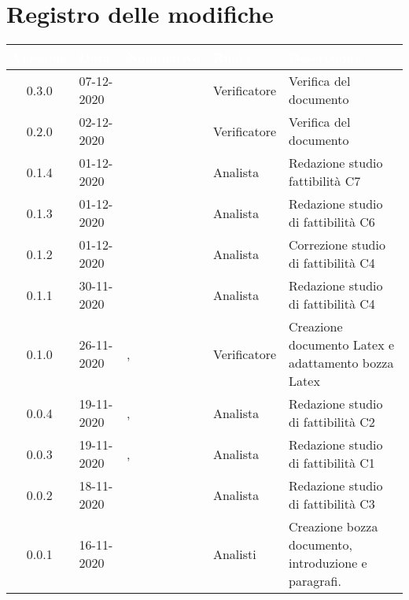 \section*{Registro delle modifiche}
{
\renewcommand{\arraystretch}{1.5}
\centering
\begin{longtable}{c C{2.6cm} C{3cm} C{2.6cm} C{5cm}}
\textcolor{white}{\textbf{Versione}}&
\textcolor{white}{\textbf{Data}}&
\textcolor{white}{\textbf{Nominativo}}&
\textcolor{white}{\textbf{Ruolo}}&
\textcolor{white}{\textbf{Descrizione}}\\	
\endhead

0.3.0 & 07-12-2020 & \SG{} & Verificatore & Verifica del documento\\  
0.2.0 & 02-12-2020 & \BM{} & Verificatore & Verifica del documento\\
0.1.4 & 01-12-2020 & \PA{} & Analista & Redazione studio fattibilità C7\\
0.1.3 & 01-12-2020 & \RA{} & Analista & Redazione studio di fattibilità C6\\
0.1.2 & 01-12-2020 & \ZM{} & Analista & Correzione studio di fattibilità C4\\
0.1.1 & 30-11-2020 & \ZM{} & Analista & Redazione studio di fattibilità C4\\
0.1.0 & 26-11-2020 & \SG{}, \BM{} & Verificatore & Creazione documento Latex e adattamento bozza Latex \\
0.0.4 & 19-11-2020 & \ZM{}, \SP{} & Analista & Redazione studio di fattibilità C2\\
0.0.3 & 19-11-2020 & \ZM{}, \SP{} & Analista & Redazione studio di fattibilità C1\\		
0.0.2 & 18-11-2020 & \PA{} & Analista & Redazione studio di fattibilità C3\\
0.0.1 & 16-11-2020 & \Gruppo{} & Analisti & Creazione bozza documento, introduzione e paragrafi. \\	
\end{longtable}
}
